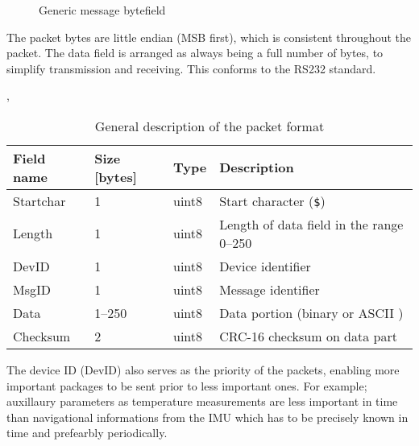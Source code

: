 \begin{figure}[h]
\centering
{}
\caption{Generic message bytefield}
\label{fig:bytefield}
\end{figure}


The packet bytes are little endian (MSB first), which is consistent throughout the packet. The data field is arranged as always being a full number of bytes, to simplify transmission and receiving. This conforms to the RS232 standard.

\begin{table}[htbp],
	\centering
	\begin{tabular}{llll}
		\toprule
		\textbf{Field name} & \textbf{Size [bytes]} & \textbf{Type} & \textbf{Description}\\
		\midrule
		Startchar & 1 & uint8 & Start character (\texttt{\$}) \\
		Length & 1 & uint8 & Length of data field in the range 0--250\\
		DevID & 1 & uint8 & Device identifier \\
		MsgID & 1 & uint8 & Message identifier \\
		Data & 1--250 & uint8 & Data portion (binary or ASCII )\\
		Checksum & 2 & uint8 & CRC-16 checksum on data part \\

		\bottomrule
	\end{tabular}
	\caption{General description of the packet format}
	\label{tab:general}
\end{table}

The device ID (DevID) also serves as the priority of the packets, enabling more important packages to be sent prior to less important ones. For example; auxillaury parameters as temperature measurements are less important in time than navigational informations from the \ac{IMU} which has to be precisely known in time and prefearbly periodically.

